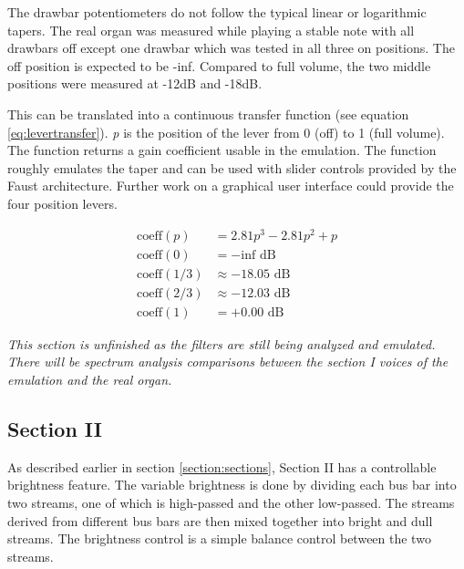 \documentclass[11pt,a4paper]{article}
\begin{document}
The drawbar potentiometers do not follow the typical linear or logarithmic tapers. The real organ was measured while playing a stable note with all drawbars off except one drawbar which was tested in all three on positions. The off position is expected to be -inf. Compared to full volume, the two middle positions were measured at -12dB and -18dB.

This can be translated into a continuous transfer function (see equation \ref{eq:levertransfer}). \emph{p} is the position of the lever from 0 (off) to 1 (full volume). The function returns a gain coefficient usable in the emulation. The function roughly emulates the taper and can be used with slider controls provided by the Faust architecture. Further work on a graphical user interface could provide the four position levers.

\begin{equation}
\label{eq:levertransfer}
\begin{split}
\mbox{coeff}(p) &= 2.81 p^3 - 2.81 p^2 + p \\
\mbox{coeff}(0) &= -\mbox{inf} \mbox{ dB}\\
\mbox{coeff}(1/3) &\approx -18.05 \mbox{ dB}\\
\mbox{coeff}(2/3) &\approx -12.03 \mbox{ dB}\\
\mbox{coeff}(1) &= +0.00 \mbox{ dB}
\end{split}
\end{equation}

\emph{This section is unfinished as the filters are still being analyzed and emulated. There will be spectrum analysis comparisons between the section I voices of the emulation and the real organ.}

\subsection{Section II}

As described earlier in section \ref{section:sections}, Section II has a controllable brightness feature. The variable brightness is done by dividing each bus bar into two streams, one of which is high-passed and the other low-passed. The streams derived from different bus bars are then mixed together into bright and dull streams. The brightness control is a simple balance control between the two streams. 

\end{document}
